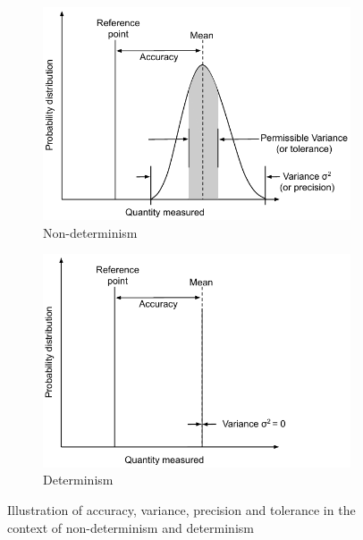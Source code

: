 \begin{figure}[!t]
    \centering

    \begin{subfigure}{.48\textwidth}
        \includegraphics[width=1\textwidth]{../other/figures/Variance_predicition_tolerance_definition_diagram_a.pdf}
        \caption{Non-determinism}
        \label{variance_description_a}
    \end{subfigure}

    \begin{subfigure}{.48\textwidth}
        \includegraphics[width=1\textwidth]{../other/figures/Variance_predicition_tolerance_definition_diagram_b.pdf}
        \caption{Determinism}
        \label{variance_description_b}
    \end{subfigure}

    \caption{Illustration of accuracy, variance, precision and tolerance in the context of non-determinism and determinism}
    \label{variance_description}
\end{figure}


